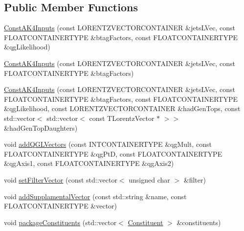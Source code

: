 \subsection*{Public Member Functions}
\begin{DoxyCompactItemize}
\item 
\hyperlink{classttUtility_1_1ConstAK4Inputs_a522b221fea2ab753e492ba17636b44a6}{Const\-A\-K4\-Inputs} (const L\-O\-R\-E\-N\-T\-Z\-V\-E\-C\-T\-O\-R\-C\-O\-N\-T\-A\-I\-N\-E\-R \&jets\-L\-Vec, const F\-L\-O\-A\-T\-C\-O\-N\-T\-A\-I\-N\-E\-R\-T\-Y\-P\-E \&btag\-Factors, const F\-L\-O\-A\-T\-C\-O\-N\-T\-A\-I\-N\-E\-R\-T\-Y\-P\-E \&qg\-Likelihood)
\item 
\hyperlink{classttUtility_1_1ConstAK4Inputs_a50a2acc8a6d659be29eba2aac920d110}{Const\-A\-K4\-Inputs} (const L\-O\-R\-E\-N\-T\-Z\-V\-E\-C\-T\-O\-R\-C\-O\-N\-T\-A\-I\-N\-E\-R \&jets\-L\-Vec, const F\-L\-O\-A\-T\-C\-O\-N\-T\-A\-I\-N\-E\-R\-T\-Y\-P\-E \&btag\-Factors)
\item 
\hyperlink{classttUtility_1_1ConstAK4Inputs_a2396ba232dc895db59170549515b294a}{Const\-A\-K4\-Inputs} (const L\-O\-R\-E\-N\-T\-Z\-V\-E\-C\-T\-O\-R\-C\-O\-N\-T\-A\-I\-N\-E\-R \&jets\-L\-Vec, const F\-L\-O\-A\-T\-C\-O\-N\-T\-A\-I\-N\-E\-R\-T\-Y\-P\-E \&btag\-Factors, const F\-L\-O\-A\-T\-C\-O\-N\-T\-A\-I\-N\-E\-R\-T\-Y\-P\-E \&qg\-Likelihood, const L\-O\-R\-E\-N\-T\-Z\-V\-E\-C\-T\-O\-R\-C\-O\-N\-T\-A\-I\-N\-E\-R \&had\-Gen\-Tops, const std\-::vector$<$ std\-::vector$<$ const T\-Lorentz\-Vector $\ast$ $>$$>$ \&had\-Gen\-Top\-Daughters)
\item 
void \hyperlink{classttUtility_1_1ConstAK4Inputs_a0f642f6a1a00aaa5301e7b0c20ff1817}{add\-Q\-G\-L\-Vectors} (const I\-N\-T\-C\-O\-N\-T\-A\-I\-N\-E\-R\-T\-Y\-P\-E \&qg\-Mult, const F\-L\-O\-A\-T\-C\-O\-N\-T\-A\-I\-N\-E\-R\-T\-Y\-P\-E \&qg\-Pt\-D, const F\-L\-O\-A\-T\-C\-O\-N\-T\-A\-I\-N\-E\-R\-T\-Y\-P\-E \&qg\-Axis1, const F\-L\-O\-A\-T\-C\-O\-N\-T\-A\-I\-N\-E\-R\-T\-Y\-P\-E \&qg\-Axis2)
\item 
void \hyperlink{classttUtility_1_1ConstAK4Inputs_ad29d1b97be9cb85f8c331a716640d2a6}{set\-Filter\-Vector} (const std\-::vector$<$ unsigned char $>$ \&filter)
\item 
void \hyperlink{classttUtility_1_1ConstAK4Inputs_aef0f8c0205fbf2fe5fd8c05e68fbe563}{add\-Supplamental\-Vector} (const std\-::string \&name, const F\-L\-O\-A\-T\-C\-O\-N\-T\-A\-I\-N\-E\-R\-T\-Y\-P\-E \&vector)
\item 
void \hyperlink{classttUtility_1_1ConstAK4Inputs_a396f7ad9dcd7c95ea36411baba8ae2a4}{package\-Constituents} (std\-::vector$<$ \hyperlink{classConstituent}{Constituent} $>$ \&constituents)
\end{DoxyCompactItemize}
